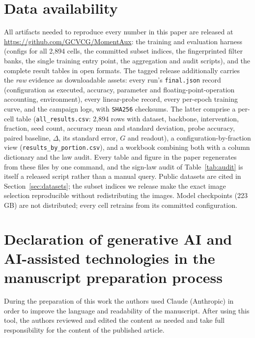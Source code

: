 \documentclass[a4paper,fleqn]{cas-dc}
\begin{document}
\section*{Data availability}
All artifacts needed to reproduce every number in this paper are released
at \url{https://github.com/GCVCG/MomentAux}: the training and
evaluation harness (configs for all 2{,}894 cells, the committed subset
indices, the fingerprinted filter banks, the single training entry point,
the aggregation and audit scripts), and the complete result tables in open
formats. The tagged release additionally carries the \emph{raw} evidence as
downloadable assets: every run's \texttt{final.json} record (configuration
as executed, accuracy, parameter and floating-point-operation accounting,
environment), every linear-probe record, every per-epoch training curve, and
the campaign logs, with \texttt{SHA256} checksums. The latter comprise a per-cell
table (\texttt{all\_results.csv}: 2{,}894 rows with dataset, backbone,
intervention, fraction, seed count, accuracy mean and standard deviation,
probe accuracy, paired baseline, $\Delta$, its standard error, $G$ and
readout), a configuration-by-fraction view
(\texttt{results\_by\_portion.csv}), and a workbook combining both with a
column dictionary and the law audit. Every table and figure in the paper
regenerates from these files by one command, and the sign-law audit of
Table~\ref{tab:audit} is itself a released script rather than a manual
query. Public datasets are cited in Section~\ref{sec:datasets}; the
subset indices we release make the exact image selection reproducible
without redistributing the images. Model checkpoints (223\,GB) are not
distributed; every cell retrains from its committed configuration.

\section*{Declaration of generative AI and AI-assisted technologies in the
manuscript preparation process}
During the preparation of this work the authors used Claude (Anthropic) in
order to improve the language and readability of the manuscript. After
using this tool, the authors reviewed and edited the content as needed and
take full responsibility for the content of the published article.





\end{document}
